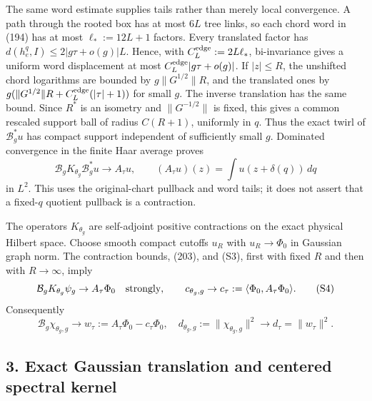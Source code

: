 \documentclass[
  11pt,
]{article}
\begin{document}
The same word estimate supplies tails rather than merely local
convergence. A path through the rooted box has at most \(6L\) tree
links, so each chord word in (194) has at most \(\ell_*:=12L+1\)
factors. Every translated factor has \(d(h_e^q,I)\le2|g\tau+o(g)|L\).
Hence, with \(C_L^{\rm edge}:=2L\ell_*\), bi-invariance gives a uniform
word displacement at most \(C_L^{\rm edge}|g\tau+o(g)|\). If
\(|z|\le R\), the unshifted chord logarithms are bounded by
\(g\|G^{1/2}\|R\), and the translated ones by
\(g(\|G^{1/2}\|R+C_L^{\rm edge}(|\tau|+1))\) for small \(g\). The
inverse translation has the same bound. Since \(R^*\) is an isometry and
\(\|G^{-1/2}\|\) is fixed, this gives a common rescaled support ball of
radius \(C(R+1)\), uniformly in \(q\). Thus the exact twirl of
\(\mathcal B_g^*u\) has compact support independent of sufficiently
small \(g\). Dominated convergence in the finite Haar average proves \[
 \mathcal B_gK_{\theta_g}\mathcal B_g^*u\to A_\tau u,\qquad
 (A_\tau u)(z)=\int u(z+\delta(q))\,dq \tag{S3}
\] in \(L^2\). This uses the original-chart pullback and word tails; it
does not assert that a fixed-\(q\) quotient pullback is a contraction.

The operators \(K_{\theta_g}\) are self-adjoint positive contractions on
the exact physical Hilbert space. Choose smooth compact cutoffs \(u_R\)
with \(u_R\to\Phi_0\) in Gaussian graph norm. The contraction bounds,
(203), and (S3), first with fixed \(R\) and then with \(R\to\infty\),
imply \[
 \mathcal B_gK_{\theta_g}\psi_g\to A_\tau\Phi_0\quad\hbox{strongly},\qquad
 c_{\theta_g,g}\to c_\tau:=\langle\Phi_0,A_\tau\Phi_0\rangle. \tag{S4}
\] Consequently \[
 \mathcal B_g\chi_{\theta_g,g}\to w_\tau:=A_\tau\Phi_0-c_\tau\Phi_0,\quad
 d_{\theta_g,g}:=\|\chi_{\theta_g,g}\|^2\to d_\tau=\|w_\tau\|^2. \tag{S5}
\]

\subsection{3. Exact Gaussian translation and centered spectral
kernel}\label{exact-gaussian-translation-and-centered-spectral-kernel}
\end{document}
